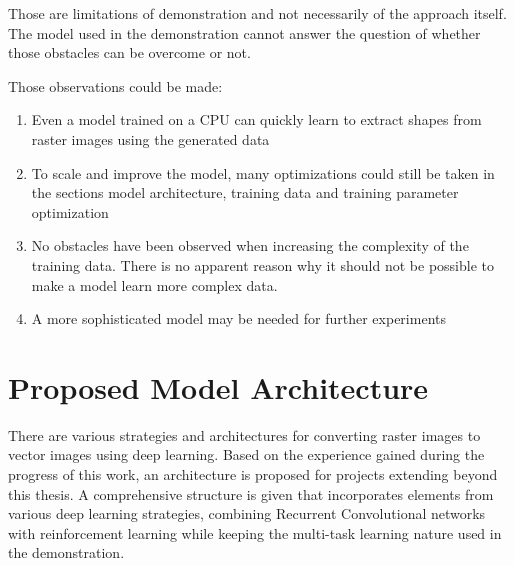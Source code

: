 \documentclass[12pt, a4paper, titlepage]{report}
\begin{document}
\vspace{0.5cm}
Those are limitations of demonstration and not necessarily of the approach itself. The model used in the demonstration cannot answer the question of whether those obstacles can be overcome or not.

Those observations could be made:

\begin{enumerate}[label=\Roman*.]
   \item Even a model trained on a CPU can quickly learn to extract shapes from raster images using the generated data
   \item To scale and improve the model, many optimizations could still be taken in the sections model architecture, training data and training parameter optimization
   \item No obstacles have been observed when increasing the complexity of the training data. There is no apparent reason why it should not be possible to make a model learn more complex data.
   \item A more sophisticated model may be needed for further experiments
\end{enumerate}



\section{Proposed Model Architecture}

There are various strategies and architectures for converting raster images to vector images using deep learning. Based on the experience gained during the progress of this work, an architecture is proposed for projects extending beyond this thesis. A comprehensive structure is given that incorporates elements from various deep learning strategies, combining Recurrent Convolutional networks with reinforcement learning while keeping the multi-task learning nature used in the demonstration.
\end{document}
